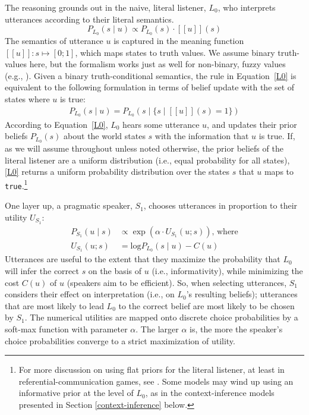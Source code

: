 \documentclass[10pt,letterpaper]{article}
\newcommand{\sem}[1]{\ensuremath{[\![#1]\!]}}
\begin{document}
The reasoning grounds out in the naive, literal listener, $L_0$, who interprets utterances according to their literal semantics.
\begin{equation} \label{L0}
P_{L_0}(s \mid u) \propto P_{L_0}(s) \cdot \sem{u}(s)
\end{equation}
The semantics of utterance $u$ is captured in the meaning function $\sem{u} \colon s \mapsto [0;1]$, which maps states to truth values.
We assume binary truth-values here, but the formalism works just as well for non-binary, fuzzy values (e.g., \cite{degenetal2020}).
Given a binary truth-conditional semantics, the rule in Equation~\eqref{L0} is equivalent to the following formulation in terms of belief update with the set of states where $u$ is true:
\begin{align}
  \label{eq:1}
  P_{L_{0}}(s \mid u) = P_{L_{0}}(s \mid \{ s \mid \sem{u}(s) = 1\})
\end{align}
According to Equation~\eqref{L0}, $L_0$ hears some utterance $u$, and updates their prior beliefs $P_{L_{0}}(s)$ about the world states $s$ with the information that $u$ is true.
If, as we will assume throughout unless noted otherwise, the prior beliefs of the literal listener are a uniform distribution (i.e., equal probability for all states), \eqref{L0} returns a uniform probability distribution over the states $s$ that $u$ maps to \texttt{true}.\footnote{For more discussion on using flat priors for the literal listener, at least in referential-communication games, see \cite{qingfranke2015}. Some models may wind up using an informative prior at the level of $L_0$, as in the context-inference models presented in Section \ref{context-inference} below.}

One layer up, a pragmatic speaker, $S_1$, chooses utterances in proportion to their utility $U_{S_{1}}$:
\begin{align} \label{S1}
  P_{S_1}(u \mid s) & \propto \exp (\alpha \cdot U_{S_1}(u;s))\text{, where} \\
  U_{S_1}(u; s) & = \textrm{log}P_{L_0}(s \mid u) - C(u) \nonumber
\end{align}
Utterances are useful to the extent that they maximize the probability that $L_0$ will infer the correct $s$ on the basis of $u$ (i.e., informativity), while minimizing the cost $C(u)$ of $u$ (speakers aim to be efficient). So, when selecting utterances, $S_1$ considers their effect on interpretation (i.e., on $L_0$'s resulting beliefs); utterances that are most likely to lead $L_0$ to the correct belief are most likely to be chosen by $S_1$.
The numerical utilities are mapped onto discrete choice probabilities by a soft-max function with parameter $\alpha$.
The larger $\alpha$ is, the more the speaker's choice probabilities converge to a strict maximization of utility.
\end{document}
